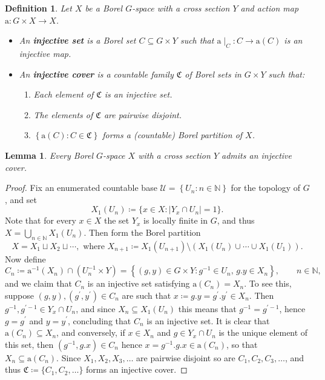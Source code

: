 \documentclass{amsart}
\numberwithin{equation}{subsection}
\newtheorem{lem}[thm]{Lemma}
\newtheorem{defn}[thm]{Definition}
\theoremstyle{remark}
\begin{document}
\begin{defn}
Let \(X\) be a Borel \(G\)-space with a cross section \(Y\) and action map \(\mathrm{a}:G\times X\to X\).
\begin{itemize}
    \item An {\bf injective set} is a Borel set \(C\subseteq G\times Y\) such that \(\mathrm{a}\mid_{C}:C\to\mathrm{a}\left(C\right)\) is an injective map.
    \item An {\bf injective cover} is a countable family \(\mathfrak{C}\) of Borel sets in \(G\times Y\) such that:
    \begin{enumerate}
    \item Each element of \(\mathfrak{C}\) is an injective set.
    \item The elements of \(\mathfrak{C}\) are pairwise disjoint.
    \item \(\left\{\mathrm{a}\left(C\right):C\in\mathfrak{C}\right\}\) forms a (countable) Borel partition of \(X\).
    \end{enumerate}
\end{itemize}
\end{defn}

\begin{lem}\label{lem:injcov}
Every Borel \(G\)-space \(X\) with a cross section \(Y\) admits an injective cover.
\end{lem}

\begin{proof}
Fix an enumerated countable base \(\mathcal{U}=\left\{ U_{n}:n\in\mathbb{N}\right\}\) for the topology of \(G\), and set
\[X_{1}\left(U_{n}\right)\coloneqq \{x\in X: \left|Y_{x}\cap U_{n}\right|=1\}.\]
Note that for every \(x\in X\) the set \(Y_{x}\) is locally finite in \(G\), and thus \(X=\bigcup_{n\in\mathbb{N}}X_{1}\left(U_{n}\right)\). Then form the Borel partition
\[X=X_{1}\sqcup X_{2}\sqcup\dotsm,\text{ where }X_{n+1}\coloneqq X_{1}\left(U_{n+1}\right)\setminus\left(X_{1}\left(U_{n}\right)\cup\dotsm\cup X_{1}\left(U_{1}\right)\right).\]
Now define
\[C_{n}\coloneqq \mathrm{a}^{-1}\left(X_{n}\right)\cap\left(U_{n}^{-1}\times Y\right)=\left\{\left(g,y\right)\in G\times Y: g^{-1}\in U_{n},\,g.y\in X_{n}\right\},\qquad n\in\mathbb{N},\]
and we claim that \(C_{n}\) is an injective set satisfying \(\mathrm{a}\left(C_{n}\right)=X_{n}\). To see this, suppose \(\left(g,y\right),\left(g^{\prime},y^{\prime}\right)\in C_{n}\) are such that \(x\coloneqq g.y=g^{\prime}.y^{\prime}\in X_{n}\). Then \(g^{-1},g^{\prime -1}\in Y_{x}\cap U_{n}\), and since \(X_{n}\subseteq X_{1}\left(U_{n}\right)\) this means that \(g^{-1}=g^{\prime -1}\), hence \(g=g^{\prime}\) and \(y=y^{\prime}\), concluding that \(C_{n}\) is an injective set. It is clear that \(\mathrm{a}\left(C_{n}\right)\subseteq X_{n}\), and conversely, if \(x\in X_{n}\) and \(g\in Y_{x}\cap U_{n}\) is the unique element of this set, then \(\left(g^{-1},g.x\right)\in C_{n}\) hence \(x=g^{-1}.g.x\in\mathrm{a}\left(C_{n}\right)\), so that \(X_{n}\subseteq\mathrm{a}\left(C_{n}\right)\). Since \(X_{1},X_{2},X_{3},\dotsc\) are pairwise disjoint so are \(C_{1},C_{2},C_{3},\dotsc\), and thus \(\mathfrak{C}\coloneqq \{C_{1},C_{2},\dotsc\}\) forms an injective cover.
\end{proof}
\end{document}
